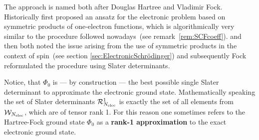The \HF approach is named both
after Douglas Hartree and Vladimir Fock.
Historically \citet{Hartree1928} first proposed
an ansatz for the electronic problem
based on symmetric products of one-electron functions, which is algorithmically very similar to the procedure followed
nowadays~(see remark~\vref{rem:SCFcoeff}).
\citet{Slater1930a}
and \citet{Fock1930} then both noted
the issue arising from the use of symmetric
products in the context of spin~(see section \vref{sec:ElectronicSchrödinger})
and subsequently Fock reformulated the procedure
using Slater determinants.

Notice, that $\Phi_0$ is --- by construction ---
the best possible single Slater determinant to
approximate the electronic ground state.
Mathematically speaking the set of Slater determinants
$\mathcal{R}^1_{N_\text{elec}}$
is exactly the set of all elements from $\mathcal{W}_{N_\text{elec}}$,
which are of tensor rank 1.
For this reason one sometimes refers to the Hartree-Fock
ground state $\Phi_0$
as a \textbf{rank-1 approximation} to the exact
electronic ground state.

